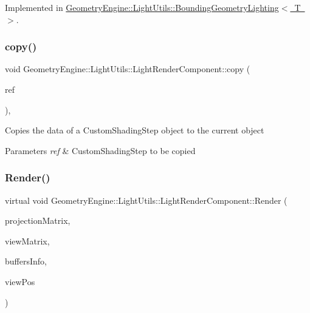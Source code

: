 Implemented in \mbox{\hyperlink{class_geometry_engine_1_1_light_utils_1_1_bounding_geometry_lighting_af28cdecb60e4230898099d85245fb5c8}{Geometry\+Engine\+::\+Light\+Utils\+::\+Bounding\+Geometry\+Lighting$<$ T $>$}}.

\mbox{\label{class_geometry_engine_1_1_light_utils_1_1_light_render_component_a3a08d64bbf4aef1300b334dd0b21ed62}} 
\subsubsection{\texorpdfstring{copy()}{copy()}}
{\footnotesize\ttfamily void Geometry\+Engine\+::\+Light\+Utils\+::\+Light\+Render\+Component\+::copy (\begin{DoxyParamCaption}\item[{const \mbox{\hyperlink{class_geometry_engine_1_1_light_utils_1_1_light_render_component}{Light\+Render\+Component}} \&}]{ref }\end{DoxyParamCaption})\hspace{0.3cm}{\ttfamily [protected]}, {\ttfamily [virtual]}}

Copies the data of a Custom\+Shading\+Step object to the current object 
\begin{DoxyParams}{Parameters}
{\em ref} & Custom\+Shading\+Step to be copied \\
\hline
\end{DoxyParams}
\mbox{\label{class_geometry_engine_1_1_light_utils_1_1_light_render_component_a025de8e4ec4345f0e7b303646a1d765b}} 
\subsubsection{\texorpdfstring{Render()}{Render()}}
{\footnotesize\ttfamily virtual void Geometry\+Engine\+::\+Light\+Utils\+::\+Light\+Render\+Component\+::\+Render (\begin{DoxyParamCaption}\item[{const Q\+Matrix4x4 \&}]{projection\+Matrix,  }\item[{const Q\+Matrix4x4 \&}]{view\+Matrix,  }\item[{const \mbox{\hyperlink{class_geometry_engine_1_1_buffers_info}{Buffers\+Info}} \&}]{buffers\+Info,  }\item[{const Q\+Vector3D \&}]{view\+Pos }\end{DoxyParamCaption})\hspace{0.3cm}{\ttfamily [pure virtual]}}

